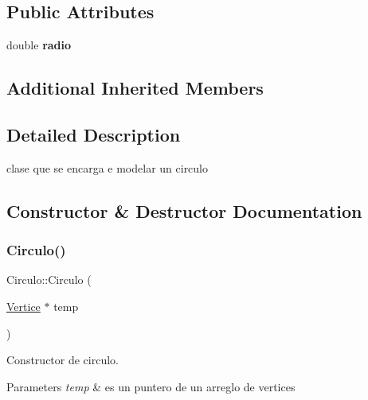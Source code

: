 \subsection*{Public Attributes}
\begin{DoxyCompactItemize}
\item 
\mbox{\label{class_circulo_aba57029c5768d344c4ef536e5323122b}} 
double {\bfseries radio}
\end{DoxyCompactItemize}
\subsection*{Additional Inherited Members}


\subsection{Detailed Description}
clase que se encarga e modelar un circulo 

\subsection{Constructor \& Destructor Documentation}
\mbox{\label{class_circulo_a790ee75260b927c3b54d534a5d2bab1c}} 
\subsubsection{\texorpdfstring{Circulo()}{Circulo()}\hspace{0.1cm}{\footnotesize\ttfamily [1/2]}}
{\footnotesize\ttfamily Circulo\+::\+Circulo (\begin{DoxyParamCaption}\item[{\hyperlink{class_vertice}{Vertice} $\ast$}]{temp }\end{DoxyParamCaption})}



Constructor de circulo. 


\begin{DoxyParams}{Parameters}
{\em temp} & es un puntero de un arreglo de vertices \\
\hline
\end{DoxyParams}
\mbox{\label{class_circulo_a6ed2ee2a18458c368ab402db2189f60f}} 
